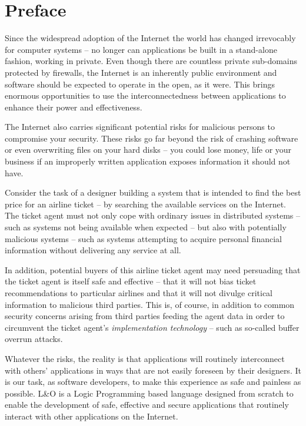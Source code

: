 \renewcommand{\chaptermark}[1]{\markboth{#1}{#1}} 
\chapter{Preface}

Since the widespread adoption of the Internet the world has changed irrevocably for computer systems -- no longer can applications be built in a stand-alone fashion, working in private. Even though there are countless private sub-domains protected by firewalls, the Internet is an inherently public environment and software should be expected to operate in the open, as it were. This brings enormous opportunities to use the interconnectedness between applications to enhance their power and effectiveness.

The Internet also carries significant potential risks for malicious persons to compromise your security. These risks go far beyond the risk of crashing software or even overwriting files on your hard disks -- you could lose money, life or your business if an improperly written application exposes information it should not have.

Consider the task of a designer building a system that is intended to find the best price for an airline ticket -- by searching the available services on the Internet. The ticket agent must not only cope with ordinary issues in distributed systems -- such as systems not being available when expected -- but also with potentially malicious systems -- such as systems attempting to acquire personal financial information without delivering any service at all.

In addition, potential buyers of this airline ticket agent may need persuading that the ticket agent is itself safe and effective -- that it will not bias ticket recommendations to particular airlines and that it will not divulge critical information to malicious third parties. This is, of course, in addition to common security concerns arising from third parties feeding the agent data in order to circumvent the ticket agent's \textit{implementation technology} -- such as so-called buffer overrun attacks.

Whatever the risks, the reality is that applications will routinely interconnect with others' applications in ways that are not easily foreseen by their designers. It is our task, as software developers, to make this experience as safe and painless as possible. L&O is a Logic Programming based language designed from scratch to enable the development of safe, effective and secure applications that routinely interact with other applications on the Internet.

